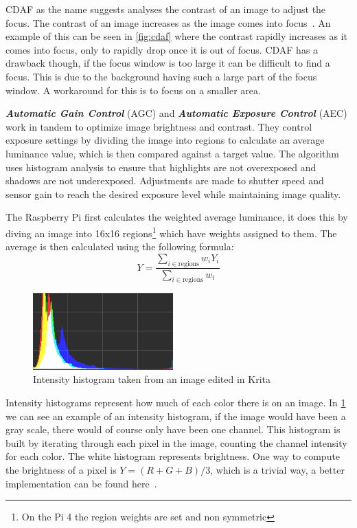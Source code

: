 CDAF as the name suggests analyses the contrast of an image to adjust the
focus. The contrast of an image increases as the image comes into focus~\cite{xu2011robust}.
An example of this can be seen in \cref{fig:cdaf} where the contrast rapidly
increases as it comes into focus, only to rapidly drop once it is out of focus.
CDAF has a drawback though, if the focus window is too large it can be difficult
to find a focus. This is due to the background having such a large part of the
focus window. A workaround for this is to focus on a smaller area.

\textit{\textbf{Automatic Gain Control}} (AGC) and \textit{\textbf{Automatic
Exposure Control}} (AEC) work in tandem to optimize image brightness and
contrast. They control exposure settings by dividing the image into regions to
calculate an average luminance value, which is then compared against a target
value. The algorithm uses histogram analysis to ensure that highlights are not
overexposed and shadows are not underexposed. Adjustments are made to shutter
speed and sensor gain to reach the desired exposure level while maintaining
image quality.

The Raspberry Pi first calculates the weighted average luminance, it does this
by diving an image into 16x16 regions\footnote{On the Pi 4 the region weights are
set and non symmetric} which have weights assigned to them. The average is then
calculated using the following formula:~\[Y = \frac{\sum_{i \in \text{regions}} w_i Y_i}{\sum_{i \in \text{regions}} w_i}\]

\begin{figure}
    \centering
    \includegraphics[width=0.48\textwidth]{figures/histogram.png}
    \caption{Intensity histogram taken from an image edited in Krita}
    \label{fig:intensityhistogram}
\end{figure}
Intensity histograms represent how much of each color there is on an image. In
\cref{fig:intensityhistogram} we can see an example of an intensity histogram,
if the image would have been a gray scale, there would of course only have been
one channel. This histogram is built by iterating through each pixel in the
image, counting the channel intensity for each color. The white histogram
represents brightness. One way to compute the brightness of a pixel is $Y = (R
+ G + B) / 3$, which is a trivial way, a better implementation can be found
here~\cite{kumar2010theory}.

